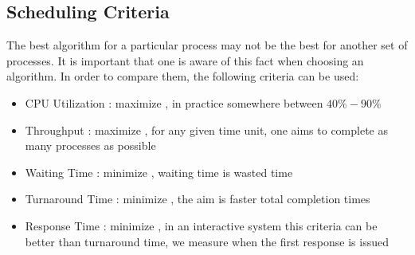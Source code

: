 
	\subsection{Scheduling Criteria}

		\par{The best algorithm for a particular process may not be the best for another set of processes. It is important that one is aware of this fact when choosing an algorithm. In order to compare them, the following criteria can be used:}

			\begin{itemize}
				\item[]CPU Utilization : maximize , in practice somewhere between $40\%-90\%$
				\item[]Throughput : maximize , for any given time unit, one aims to complete as many processes as possible 
				\item[]Waiting Time : minimize , waiting time is wasted time
				\item[]Turnaround Time : minimize , the aim is faster total completion times 
				\item[]Response Time : minimize , in an interactive system this criteria can be better than turnaround time, we measure when the first response is issued
			\end{itemize}


